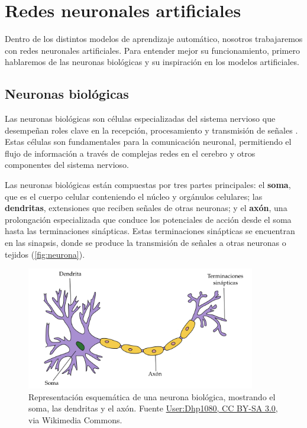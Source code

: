 
\chapter{Redes neuronales artificiales}
\label{chapter:ann}

Dentro de los distintos modelos de aprendizaje automático, nosotros trabajaremos
con redes neuronales artificiales. Para entender mejor su funcionamiento,
primero hablaremos de las neuronas biológicas y su inspiración en los modelos
artificiales.

\section{Neuronas biológicas}

Las neuronas biológicas son células especializadas del sistema nervioso que desempeñan
roles clave en la recepción, procesamiento y transmisión de señales
\cite{rosenblatt1958perceptron}. Estas células son fundamentales para la comunicación
neuronal, permitiendo el flujo de información a través de complejas redes en el
cerebro y otros componentes del sistema nervioso.

Las neuronas biológicas están compuestas por tres partes principales: el \textbf{soma},
que es el cuerpo celular conteniendo el núcleo y orgánulos celulares; las
\textbf{dendritas}, extensiones que reciben señales de otras neuronas; y el \textbf{axón},
una prolongación especializada que conduce los potenciales de acción desde el soma
hasta las terminaciones sinápticas. Estas terminaciones sinápticas se encuentran
en las sinapsis, donde se produce la transmisión de señales a otras neuronas o tejidos
(\autoref{fig:neurona}).

\begin{figure}[H]
	\centering
	\includegraphics[width=100mm, scale=0.5]{img/neuron.png}
	\caption{Representación esquemática de una neurona biológica, mostrando el soma,
		las dendritas y el axón. Fuente \href{http://creativecommons.org/licenses/by-sa/3.0/}{User:Dhp1080,
			CC BY-SA 3.0}, via Wikimedia Commons.}
	\label{fig:neurona}
\end{figure}


